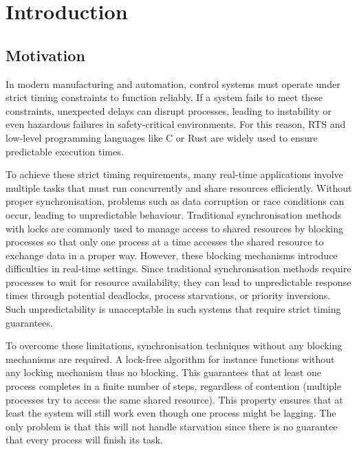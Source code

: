 \chapter{Introduction}\label{ch:introduction}

\section{Motivation}\label{sec:motivation}

In modern manufacturing and automation, control systems must operate under strict timing constraints to function reliably. If a system fails to meet these constraints, unexpected delays can disrupt processes, leading to instability or even hazardous failures in safety-critical environments. For this reason, \ac{RTS} and low-level programming languages like C or Rust are widely used to ensure predictable execution times.

To achieve these strict timing requirements, many real-time applications involve multiple tasks that must run concurrently and share resources efficiently. Without proper synchronisation, problems such as data corruption or race conditions can occur, leading to unpredictable behaviour. Traditional synchronisation methods with locks are commonly used to manage access to shared resources by blocking processes so that only one process at a time accesses the shared resource to exchange data in a proper way. However, these blocking mechanisms introduce difficulties in real-time settings. Since traditional synchronisation methods require processes to wait for resource availability, they can lead to unpredictable response times through potential deadlocks, process starvations, or priority inversions. Such unpredictability is unacceptable in such systems that require strict timing guarantees. \cite{herlihy1991wait, brandenburg2019multiprocessorrealtimelockingprotocols, kode2024analysisSynchronization}

To overcome these limitations, synchronisation techniques without any blocking mechanisms are required. A lock-free algorithm for instance functions without any locking mechanism thus no blocking. This guarantees that at least one process completes in a finite number of steps, regardless of contention (multiple processes try to access the same shared resource). This property ensures that at least the system will still work even though one process might be lagging. The only problem is that this will not handle starvation since there is no guarantee that every process will finish its task. \cite{kogan2012methodology}

